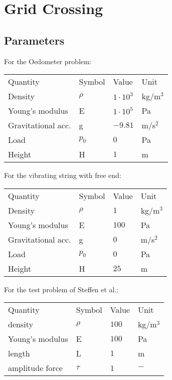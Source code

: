 \documentclass[a4paper,12pt]{report}
\begin{document}
\section*{Grid Crossing}

\subsection*{Parameters}
For the Oedometer problem:

\begin{table}[h]
\centering
\begin{tabular}{l|l|l|l}
Quantity  & Symbol & Value  & Unit  \\ \cline{1-4}
   Density & $\rho$ & $1 \cdot 10^3$ & kg/m$^3$\\
   Young's modulus & E & $1 \cdot 10^5$ & Pa\\ 
Gravitational acc. & g & $-9.81$ & m/s$^2$ \\
Load & $p_0$ & $0$ & Pa \\
  Height  & H & $1$ & m \\ 
\end{tabular}
\end{table}

For the vibrating string with free end:

\begin{table}[h]
\centering
\begin{tabular}{l|l|l|l}
Quantity  & Symbol & Value  & Unit  \\ \cline{1-4}
   Density & $\rho$ & $1$ & kg/m$^3$\\
   Young's modulus & E & $100$ & Pa\\ 
Gravitational acc. & g & $0$ & m/s$^2$ \\
Load & $p_0$ & $0$ & Pa \\
  Height  & H & $25$ & m \\ 
\end{tabular}
\end{table}

For the test problem of Steffen et al.:

\begin{table}[h]
\centering
\begin{tabular}{l|l|l|l}
Quantity  & Symbol & Value  & Unit  \\ \cline{1-4}
   density & $\rho$ & $100$ & kg/m$^3$\\
   Young's modulus & E & $100$ & Pa\\ 
  length  & L & $1$ & m \\  
  amplitude force & $\tau$ & 1 & $-$\\
\end{tabular}
\end{table}
\end{document}
